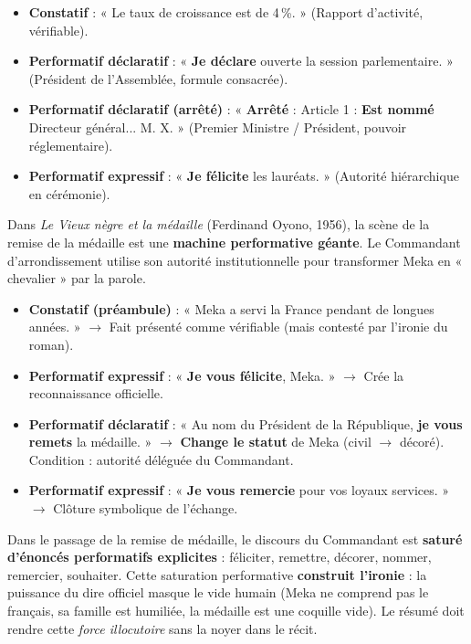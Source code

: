 \documentclass[11pt]{article}
\begin{document}
\begin{exemplebox}
\begin{itemize}
    \item \textbf{Constatif} : « Le taux de croissance est de 4\,\%. » (Rapport d'activité, vérifiable).
    \item \textbf{Performatif déclaratif} : « \textbf{Je déclare} ouverte la session parlementaire. » (Président de l'Assemblée, formule consacrée).
    \item \textbf{Performatif déclaratif (arrêté)} : « \textbf{Arrêté} : Article 1 : \textbf{Est nommé} Directeur général... M. X. » (Premier Ministre / Président, pouvoir réglementaire).
    \item \textbf{Performatif expressif} : « \textbf{Je félicite} les lauréats. » (Autorité hiérarchique en cérémonie).
\end{itemize}
\end{exemplebox}

Dans \emph{Le Vieux nègre et la médaille} (Ferdinand Oyono, 1956), la scène de la remise de la médaille est une \textbf{machine performative géante}. Le Commandant d'arrondissement utilise son autorité institutionnelle pour transformer Meka en « chevalier » par la parole.

\begin{exemplebox}
\begin{itemize}
    \item \textbf{Constatif (préambule)} : « Meka a servi la France pendant de longues années. » $\rightarrow$ Fait présenté comme vérifiable (mais contesté par l'ironie du roman).
    \item \textbf{Performatif expressif} : « \textbf{Je vous félicite}, Meka. » $\rightarrow$ Crée la reconnaissance officielle.
    \item \textbf{Performatif déclaratif} : « Au nom du Président de la République, \textbf{je vous remets} la médaille. » $\rightarrow$ \textbf{Change le statut} de Meka (civil $\rightarrow$ décoré). Condition : autorité déléguée du Commandant.
    \item \textbf{Performatif expressif} : « \textbf{Je vous remercie} pour vos loyaux services. » $\rightarrow$ Clôture symbolique de l'échange.
\end{itemize}
\end{exemplebox}

\begin{exemplebox}
Dans le passage de la remise de médaille, le discours du Commandant est \textbf{saturé d'énoncés performatifs explicites} : féliciter, remettre, décorer, nommer, remercier, souhaiter. Cette saturation performative \textbf{construit l'ironie} : la puissance du dire officiel masque le vide humain (Meka ne comprend pas le français, sa famille est humiliée, la médaille est une coquille vide). Le résumé doit rendre cette \emph{force illocutoire} sans la noyer dans le récit.
\end{exemplebox}
\end{document}
